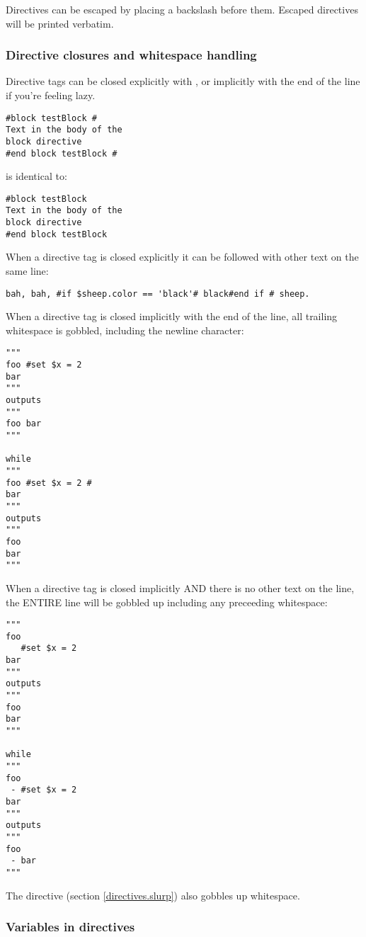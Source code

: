 Directives can be escaped by placing a backslash before them.  Escaped
directives will be printed verbatim.

\subsubsection{Directive closures and whitespace handling}
\label{language.directives.closures}
Directive tags can be closed explicitly with \code{\#}, or implicitly with the
end of the line if you're feeling lazy.

\begin{verbatim}
#block testBlock #
Text in the body of the
block directive
#end block testBlock #
\end{verbatim}
is identical to:
\begin{verbatim}
#block testBlock
Text in the body of the
block directive
#end block testBlock
\end{verbatim}

When a directive tag is closed explicitly it can be followed with other text on
the same line:

\begin{verbatim}
bah, bah, #if $sheep.color == 'black'# black#end if # sheep.
\end{verbatim}

When a directive tag is closed implicitly with the end of the line, all trailing
whitespace is gobbled, including the newline character:
\begin{verbatim}
"""
foo #set $x = 2 
bar
"""
outputs 
"""
foo bar
"""

while 
"""
foo #set $x = 2 #
bar
"""
outputs 
"""
foo 
bar
"""
\end{verbatim}

When a directive tag is closed implicitly AND there is no other text on the
line, the ENTIRE line will be gobbled up including any preceeding whitespace:
\begin{verbatim}
"""
foo 
   #set $x = 2 
bar
"""
outputs 
"""
foo
bar
"""

while 
"""
foo 
 - #set $x = 2
bar
"""
outputs 
"""
foo 
 - bar
"""
\end{verbatim}

The  directive (section
\ref{directives.slurp}) also gobbles up whitespace.

\subsubsection{Variables in directives}
\label{language.directives.variables}

